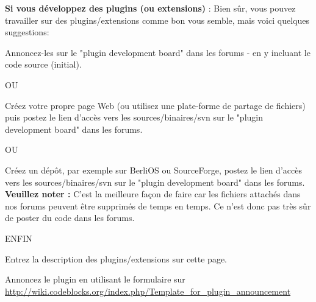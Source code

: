 \textbf{Si vous développez des plugins (ou extensions)} : Bien sûr, vous pouvez travailler sur des plugins/extensions comme bon vous semble, mais voici quelques suggestions:

\tab Annoncez-les sur le "plugin development board" dans les forums - en y incluant le code source (initial).

OU

\tab Créez votre propre page Web (ou utilisez une plate-forme de partage de fichiers) puis postez le lien d'accès vers les sources/binaires/svn sur le "plugin development board" dans les forums.

OU

\tab Créez un dépôt, par exemple sur BerliOS ou SourceForge, postez le lien d'accès vers les sources/binaires/svn sur le "plugin development board" dans les forums. \textbf{Veuillez noter :} C'est la meilleure façon de faire car les fichiers attachés dans nos forums peuvent être supprimés de temps en temps. Ce n'est donc pas très sûr de poster du code dans les forums.

ENFIN

\tab Entrez la description des plugins/extensions sur cette page.

\tab Annoncez le plugin en utilisant le formulaire sur \url{http://wiki.codeblocks.org/index.php/Template_for_plugin_announcement}

\begin{ASTYLE}

\end{ASTYLE}

\begin{AUTOVERSIONING}

\end{AUTOVERSIONING}

\begin{BROWSETRACKS}

\end{BROWSETRACKS}

\begin{CODESNIPPETS}

\end{CODESNIPPETS}

\begin{CODECOMPLETION}

\end{CODECOMPLETION}

\begin{DOXYBLOCKS}

\end{DOXYBLOCKS}

\begin{EDITORTWEAKS}

\end{EDITORTWEAKS}


